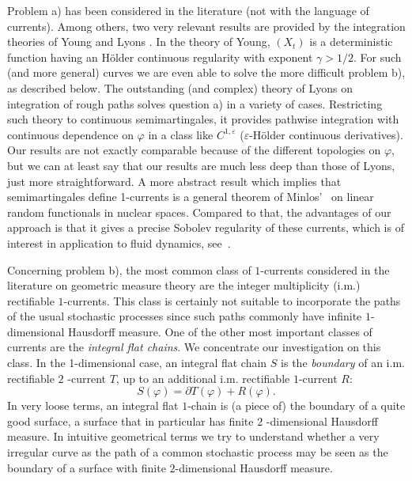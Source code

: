 \documentclass{article}
\begin{document}
Problem a) has been considered in the literature (not with the language of
currents). Among others, two very relevant results are provided by the
integration theories of Young \cite{Young} and Lyons \cite{Lyons}. In the
theory of Young, $\left( X_{t}\right) $ is a deterministic function having
an H\"{o}lder continuous regularity with exponent $\gamma > 1/2$. For
such (and more general) curves we are even able to solve the more difficult
problem b), as described below. The outstanding (and complex) theory of
Lyons on integration of rough paths solves question a) in a variety of
cases. Restricting such theory to continuous semimartingales, it provides
pathwise integration with continuous dependence on $\varphi $ in a class
like $C^{1,\varepsilon }$ ($\varepsilon $-H\"{o}lder continuous
derivatives). Our results are not exactly comparable because of the
different topologies on $\varphi $, but we can at least say that our results
are much less deep than those of Lyons, just more straightforward.
A more abstract result which implies that semimartingales define
1-currents is a general theorem of Minlos'~\cite{Fernique} on linear
random functionals in nuclear spaces. Compared to that, the advantages
of our approach is that it gives a precise Sobolev regularity of these
currents, which is of interest in application to fluid dynamics,
see~\cite{Ascona}.  

Concerning problem b), the most common class of $1$-currents considered in
the literature on geometric measure theory are the integer multiplicity
(i.m.) rectifiable $1$-currents. This class is certainly not suitable to
incorporate the paths of the usual stochastic processes since such paths
commonly have infinite $1$-dimensional Hausdorff measure. One of the other
most important classes of currents are the \textit{integral flat chains}. We
concentrate our investigation on this class. In the 1-dimensional case, an
integral flat chain $S$ is the \textit{boundary} of an i.m. rectifiable $2$%
-current $T$, up to an additional i.m. rectifiable $1$-current $R$: 
\begin{equation*}
S\left( \varphi \right) =\partial T\left( \varphi \right) +R\left( \varphi
\right) .
\end{equation*}
In very loose terms, an integral flat $1$-chain is (a piece of) the boundary
of a quite good surface, a surface that in particular has finite $2$%
-dimensional Hausdorff measure. In intuitive geometrical terms we try to
understand whether a very irregular curve as the path of a common stochastic
process may be seen as the boundary of a surface with finite $2$-dimensional
Hausdorff measure.
\end{document}

